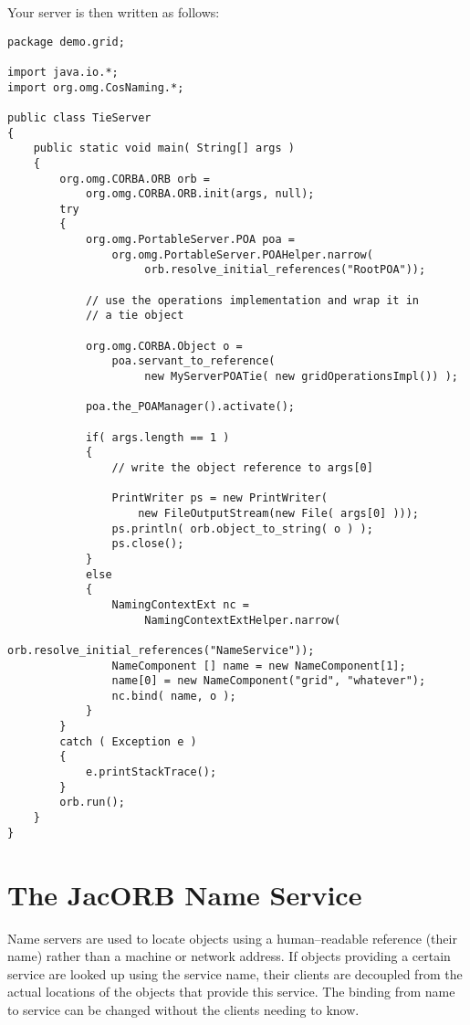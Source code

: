 \documentclass[12pt]{scrbook}
\begin{document}
Your server is then written as follows:

\begin{verbatim}
package demo.grid;

import java.io.*;
import org.omg.CosNaming.*;

public class TieServer
{
    public static void main( String[] args )
    {
        org.omg.CORBA.ORB orb = 
            org.omg.CORBA.ORB.init(args, null);
        try
        {
            org.omg.PortableServer.POA poa = 
                org.omg.PortableServer.POAHelper.narrow(
                     orb.resolve_initial_references("RootPOA"));

            // use the operations implementation and wrap it in
            // a tie object

            org.omg.CORBA.Object o = 
                poa.servant_to_reference( 
                     new MyServerPOATie( new gridOperationsImpl()) );

            poa.the_POAManager().activate();

            if( args.length == 1 ) 
            {
                // write the object reference to args[0]

                PrintWriter ps = new PrintWriter(
                    new FileOutputStream(new File( args[0] )));
                ps.println( orb.object_to_string( o ) );
                ps.close();
            } 
            else
            {
                NamingContextExt nc = 
                     NamingContextExtHelper.narrow(
                        orb.resolve_initial_references("NameService"));
                NameComponent [] name = new NameComponent[1];
                name[0] = new NameComponent("grid", "whatever");
                nc.bind( name, o );
            }
        } 
        catch ( Exception e )
        {
            e.printStackTrace();
        }
        orb.run();
    }
}
\end{verbatim}





\chapter{The JacORB Name Service}
\label{names}

Name  servers  are used  to  locate  objects  using a  human--readable
reference (their  name) rather than  a machine or network  address. If
objects providing  a certain service  are looked up using  the service
name, their  clients are  decoupled from the  actual locations  of the
objects that provide  this service.  The binding from  name to service
can be changed without the clients needing to know.
\end{document}

